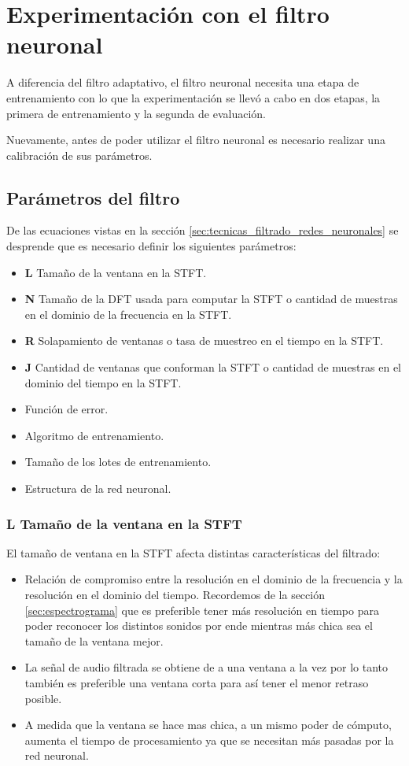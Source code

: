 \section{Experimentación con el filtro neuronal}

A diferencia del filtro adaptativo, el filtro neuronal necesita una etapa de entrenamiento con lo que la experimentación se llevó a cabo en dos etapas, la primera de entrenamiento y la segunda de evaluación. 

Nuevamente, antes de poder utilizar el filtro neuronal es necesario realizar una calibración de sus parámetros.

\subsection{Parámetros del filtro}

De las ecuaciones vistas en la sección \ref{sec:tecnicas_filtrado_redes_neuronales} se desprende que es necesario definir los siguientes parámetros:

\begin{itemize}
	\item \textbf{L} Tamaño de la ventana en la STFT.
	\item \textbf{N} Tamaño de la DFT usada para computar la STFT o cantidad de muestras en el dominio de la frecuencia en la STFT.
	\item \textbf{R} Solapamiento de ventanas o tasa de muestreo en el tiempo en la STFT.
	\item \textbf{J} Cantidad de ventanas que conforman la STFT o cantidad de muestras en el dominio del tiempo en la STFT. 
	\item Función de error.
	\item Algoritmo de entrenamiento.
	\item Tamaño de los lotes de entrenamiento.
	\item Estructura de la red neuronal.
\end{itemize}

\subsubsection{L Tamaño de la ventana en la STFT}

El tamaño de ventana en la STFT afecta distintas características del filtrado:

\begin{itemize}
	\item Relación de compromiso entre la resolución en el dominio de la frecuencia y la resolución en el dominio del tiempo. Recordemos de la sección \ref{sec:espectrograma} que es preferible tener más resolución en tiempo para poder reconocer los distintos sonidos por ende mientras más chica sea el tamaño de la ventana mejor.
	\item La señal de audio filtrada se obtiene de a una ventana a la vez por lo tanto también es preferible una ventana corta para así tener el menor retraso posible.
	\item A medida que la ventana se hace mas chica, a un mismo poder de cómputo, aumenta el tiempo de procesamiento ya que se necesitan más pasadas por la red neuronal.
\end{itemize}

